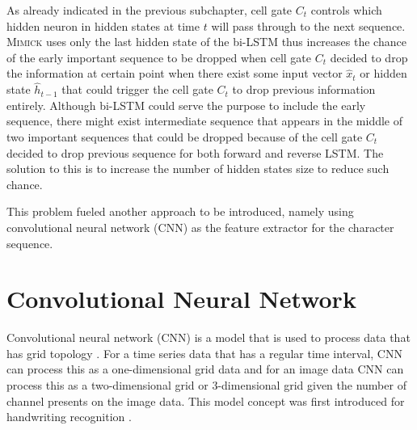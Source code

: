     As already indicated in the previous subchapter, cell gate $C_t$
    controls which hidden neuron in hidden states at time $t$ will
    pass through to the next sequence. \textsc{Mimick} uses only the
    last hidden state of the bi-LSTM thus increases the chance of the
    early important sequence to be dropped when cell gate $C_t$
    decided to drop the information at certain point when there exist
    some input vector $\hat{x}_t$ or hidden state $\hat{h}_{t-1}$ that
    could trigger the cell gate $C_t$ to drop previous information
    entirely. Although bi-LSTM could serve the purpose to include the
    early sequence, there might exist intermediate sequence that
    appears in the middle of two important sequences that could be
    dropped because of the cell gate $C_t$ decided to drop previous
    sequence for both forward and reverse LSTM. The solution to this
    is to increase the number of hidden states size to reduce such
    chance. 
    
    This problem fueled another approach to be introduced, namely
    using convolutional neural network (CNN) as the feature extractor
    for the character sequence. 

\section{Convolutional Neural Network}
    Convolutional neural network (CNN) is a model that is used to
    process data that has grid topology \citep{Goodfellow-et-al-2016}.
    For a time series data that has a regular time interval, CNN can
    process this as a one-dimensional grid data and for an image data
    CNN can process this as a two-dimensional grid or 3-dimensional
    grid given the number of channel presents on the image data. This
    model concept was first introduced for handwriting recognition
    \citep{generalization1989lecun}.

